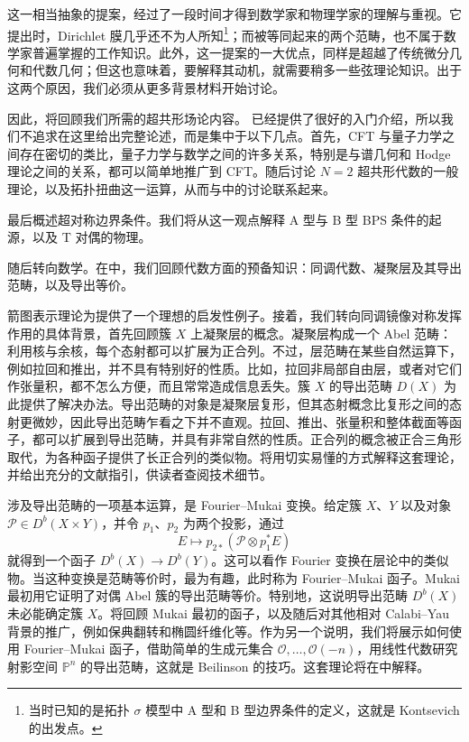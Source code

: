 这一相当抽象的提案，经过了一段时间才得到数学家和物理学家的理解与重视。它提出时，Dirichlet 膜几乎还不为人所知\footnote{当时已知的是拓扑 $\sigma$ 模型中 A 型和 B 型边界条件的定义，这就是 Kontsevich 的出发点。}；而被等同起来的两个范畴，也不属于数学家普遍掌握的工作知识。此外，这一提案的一大优点，同样是超越了传统微分几何和代数几何；但这也意味着，要解释其动机，就需要稍多一些弦理论知识。出于这两个原因，我们必须从更多背景材料开始讨论。

因此，将回顾我们所需的超共形场论内容。 已经提供了很好的入门介绍，所以我们不追求在这里给出完整论述，而是集中于以下几点。首先，CFT 与量子力学之间存在密切的类比，量子力学与数学之间的许多关系，特别是与谱几何和 Hodge 理论之间的关系，都可以简单地推广到 CFT。随后讨论 $N=2$ 超共形代数的一般理论，以及拓扑扭曲这一运算，从而与中的讨论联系起来。

最后概述超对称边界条件。我们将从这一观点解释 A 型与 B 型 BPS 条件的起源，以及 T 对偶的物理。

随后转向数学。在中，我们回顾代数方面的预备知识：同调代数、凝聚层及其导出范畴，以及导出等价。

箭图表示理论为提供了一个理想的启发性例子。接着，我们转向同调镜像对称发挥作用的具体背景，首先回顾簇 $X$ 上凝聚层的概念。凝聚层构成一个 Abel 范畴：利用核与余核，每个态射都可以扩展为正合列。不过，层范畴在某些自然运算下，例如拉回和推出，并不具有特别好的性质。比如，拉回非局部自由层，或者对它们作张量积，都不怎么方便，而且常常造成信息丢失。簇 $X$ 的导出范畴 $D(X)$ 为此提供了解决办法。导出范畴的对象是凝聚层复形，但其态射概念比复形之间的态射更微妙，因此导出范畴乍看之下并不直观。拉回、推出、张量积和整体截面等函子，都可以扩展到导出范畴，并具有非常自然的性质。正合列的概念被正合三角形取代，为各种函子提供了长正合列的类似物。将用切实易懂的方式解释这套理论，并给出充分的文献指引，供读者查阅技术细节。

涉及导出范畴的一项基本运算，是 Fourier--Mukai 变换。给定簇 $X$、$Y$ 以及对象 $\mathcal{P}\in D^b(X\times Y)$，并令 $p_1$、$p_2$ 为两个投影，通过
\[
E\longmapsto p_{2*}(\mathcal{P}\otimes p_1^*E)
\]
就得到一个函子 $D^b(X)\to D^b(Y)$。这可以看作 Fourier 变换在层论中的类似物。当这种变换是范畴等价时，最为有趣，此时称为 Fourier--Mukai 函子。Mukai 最初用它证明了对偶 Abel 簇的导出范畴等价。特别地，这说明导出范畴 $D^b(X)$ 未必能确定簇 $X$。将回顾 Mukai 最初的函子，以及随后对其他相对 Calabi--Yau 背景的推广，例如保典翻转和椭圆纤维化等。作为另一个说明，我们将展示如何使用 Fourier--Mukai 函子，借助简单的生成元集合 $\mathcal{O},\ldots,\mathcal{O}(-n)$，用线性代数研究射影空间 $\mathbb{P}^n$ 的导出范畴，这就是 Beilinson 的技巧。这套理论将在中解释。

